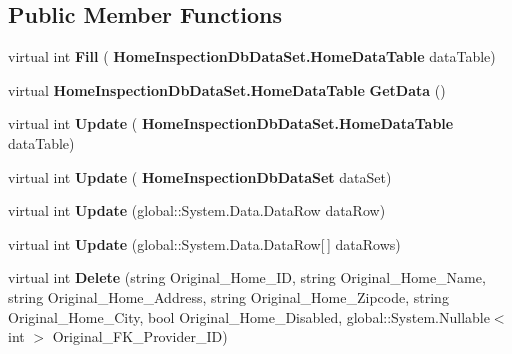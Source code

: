 \subsection*{Public Member Functions}
\begin{DoxyCompactItemize}
\item 
\mbox{\label{class_a_f_h___scheduler_1_1_home_inspection_db_data_set_table_adapters_1_1_home_table_adapter_a923426e5be1d26e1f5061285675297be}} 
virtual int {\bfseries Fill} (\textbf{ Home\+Inspection\+Db\+Data\+Set.\+Home\+Data\+Table} data\+Table)
\item 
\mbox{\label{class_a_f_h___scheduler_1_1_home_inspection_db_data_set_table_adapters_1_1_home_table_adapter_ad11356bcfc9d2a0109a2909c3dc8730b}} 
virtual \textbf{ Home\+Inspection\+Db\+Data\+Set.\+Home\+Data\+Table} {\bfseries Get\+Data} ()
\item 
\mbox{\label{class_a_f_h___scheduler_1_1_home_inspection_db_data_set_table_adapters_1_1_home_table_adapter_a2662f54c2529103b67db2592dd5d3d74}} 
virtual int {\bfseries Update} (\textbf{ Home\+Inspection\+Db\+Data\+Set.\+Home\+Data\+Table} data\+Table)
\item 
\mbox{\label{class_a_f_h___scheduler_1_1_home_inspection_db_data_set_table_adapters_1_1_home_table_adapter_a8d948293b463d5fb1c3f8ff499b55db7}} 
virtual int {\bfseries Update} (\textbf{ Home\+Inspection\+Db\+Data\+Set} data\+Set)
\item 
\mbox{\label{class_a_f_h___scheduler_1_1_home_inspection_db_data_set_table_adapters_1_1_home_table_adapter_aa6a788027c99f3313971c2a0b2c0b63c}} 
virtual int {\bfseries Update} (global\+::\+System.\+Data.\+Data\+Row data\+Row)
\item 
\mbox{\label{class_a_f_h___scheduler_1_1_home_inspection_db_data_set_table_adapters_1_1_home_table_adapter_a9755821593a8fe07500da8b7cf92edfa}} 
virtual int {\bfseries Update} (global\+::\+System.\+Data.\+Data\+Row[$\,$] data\+Rows)
\item 
\mbox{\label{class_a_f_h___scheduler_1_1_home_inspection_db_data_set_table_adapters_1_1_home_table_adapter_a954c0389819b750cd9025f42634eba6b}} 
virtual int {\bfseries Delete} (string Original\+\_\+\+Home\+\_\+\+ID, string Original\+\_\+\+Home\+\_\+\+Name, string Original\+\_\+\+Home\+\_\+\+Address, string Original\+\_\+\+Home\+\_\+\+Zipcode, string Original\+\_\+\+Home\+\_\+\+City, bool Original\+\_\+\+Home\+\_\+\+Disabled, global\+::\+System.\+Nullable$<$ int $>$ Original\+\_\+\+F\+K\+\_\+\+Provider\+\_\+\+ID)
\item 
\mbox{\label{class_a_f_h___scheduler_1_1_home_inspection_db_data_set_table_adapters_1_1_home_table_adapter_a23a63e6693ee6530eb5683b7358bc685}} 

\end{DoxyCompactItemize}
